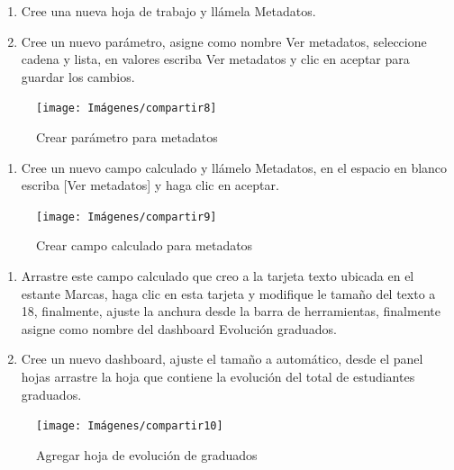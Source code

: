 \documentclass[
]{book}
\providecommand{\tightlist}{%
  \setlength{\itemsep}{0pt}\setlength{\parskip}{0pt}}
\begin{document}
\begin{enumerate}
\def\labelenumi{\arabic{enumi}.}
\item
  Cree una nueva hoja de trabajo y llámela Metadatos.
\item
  Cree un nuevo parámetro, asigne como nombre Ver metadatos, seleccione cadena y lista, en valores escriba Ver metadatos y clic en aceptar para guardar los cambios.
\end{enumerate}

\begin{figure}

{\centering \texttt{[image: Imágenes/compartir8]} 

}

\caption{Crear parámetro para metadatos}\label{fig:parametrometadatos-fig}
\end{figure}

\begin{enumerate}
\def\labelenumi{\arabic{enumi}.}
\setcounter{enumi}{2}
\tightlist
\item
  Cree un nuevo campo calculado y llámelo Metadatos, en el espacio en blanco escriba {[}Ver metadatos{]} y haga clic en aceptar.
\end{enumerate}

\begin{figure}

{\centering \texttt{[image: Imágenes/compartir9]} 

}

\caption{Crear campo calculado para metadatos}\label{fig:campocalculadometadatos-fig}
\end{figure}

\begin{enumerate}
\def\labelenumi{\arabic{enumi}.}
\setcounter{enumi}{3}
\item
  Arrastre este campo calculado que creo a la tarjeta texto ubicada en el estante Marcas, haga clic en esta tarjeta y modifique le tamaño del texto a 18, finalmente, ajuste la anchura desde la barra de herramientas, finalmente asigne como nombre del dashboard Evolución graduados.
\item
  Cree un nuevo dashboard, ajuste el tamaño a automático, desde el panel hojas arrastre la hoja que contiene la evolución del total de estudiantes graduados.
\end{enumerate}

\begin{figure}

{\centering \texttt{[image: Imágenes/compartir10]} 

}

\caption{Agregar hoja de evolución de graduados}\label{fig:evolucion-fig}
\end{figure}
\end{document}
